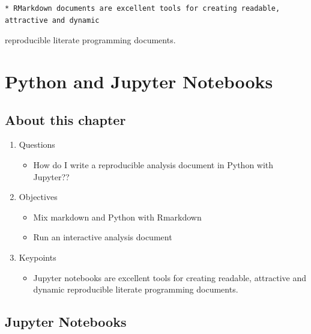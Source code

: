 \documentclass[
]{book}
\providecommand{\tightlist}{%
  \setlength{\itemsep}{0pt}\setlength{\parskip}{0pt}}
\newenvironment{roundup}
{ \begin{tcolorbox}[colbacktitle=yellow!50!white,
title=Round Up,coltitle=black,
fonttitle=\bfseries] }
{  \end{tcolorbox} }
\begin{document}
\begin{roundup}
\begin{verbatim}
* RMarkdown documents are excellent tools for creating readable, attractive and dynamic 
\end{verbatim}

reproducible literate programming documents.
\end{roundup}

\hypertarget{python-and-jupyter-notebooks}{%
\chapter{Python and Jupyter Notebooks}\label{python-and-jupyter-notebooks}}

\hypertarget{about-this-chapter-1}{%
\section{About this chapter}\label{about-this-chapter-1}}

\begin{enumerate}
\def\labelenumi{\arabic{enumi}.}
\tightlist
\item
  Questions

  \begin{itemize}
  \tightlist
  \item
    How do I write a reproducible analysis document in Python with Jupyter??
  \end{itemize}
\item
  Objectives

  \begin{itemize}
  \tightlist
  \item
    Mix markdown and Python with Rmarkdown
  \item
    Run an interactive analysis document
  \end{itemize}
\item
  Keypoints

  \begin{itemize}
  \tightlist
  \item
    Jupyter notebooks are excellent tools for creating readable, attractive and dynamic reproducible literate programming documents.
  \end{itemize}
\end{enumerate}

\hypertarget{jupyter-notebooks}{%
\section{Jupyter Notebooks}\label{jupyter-notebooks}}
\end{document}
